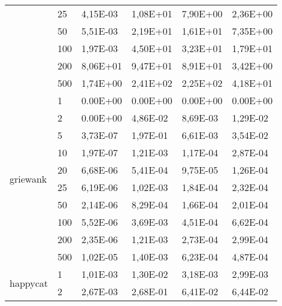 \begin{longtable}[c]{|p{3.5cm}|l|l|l|l|l|}
                                        & 25        & 4,15E-03   & 1,08E+01   & 7,90E+00   & 2,36E+00  \\ \cline{2-6} 
                                        & 50        & 5,51E-03   & 2,19E+01   & 1,61E+01   & 7,35E+00  \\ \cline{2-6} 
                                        & 100       & 1,97E-03   & 4,50E+01   & 3,23E+01   & 1,79E+01  \\ \cline{2-6} 
                                        & 200       & 8,06E+01   & 9,47E+01   & 8,91E+01   & 3,42E+00  \\ \cline{2-6} 
                                        & 500       & 1,74E+00   & 2,41E+02   & 2,25E+02   & 4,18E+01  \\ \hline
\multirow[t]{10}{*}{griewank}              & 1         & 0.00E+00   & 0.00E+00   & 0.00E+00   & 0.00E+00  \\ \cline{2-6} 
                                        & 2         & 0.00E+00   & 4,86E-02   & 8,69E-03   & 1,29E-02  \\ \cline{2-6} 
                                        & 5         & 3,73E-07   & 1,97E-01   & 6,61E-03   & 3,54E-02  \\ \cline{2-6} 
                                        & 10        & 1,97E-07   & 1,21E-03   & 1,17E-04   & 2,87E-04  \\ \cline{2-6} 
                                        & 20        & 6,68E-06   & 5,41E-04   & 9,75E-05   & 1,26E-04  \\ \cline{2-6} 
                                        & 25        & 6,19E-06   & 1,02E-03   & 1,84E-04   & 2,32E-04  \\ \cline{2-6} 
                                        & 50        & 2,14E-06   & 8,29E-04   & 1,66E-04   & 2,01E-04  \\ \cline{2-6} 
                                        & 100       & 5,52E-06   & 3,69E-03   & 4,51E-04   & 6,62E-04  \\ \cline{2-6} 
                                        & 200       & 2,35E-06   & 1,21E-03   & 2,73E-04   & 2,99E-04  \\ \cline{2-6} 
                                        & 500       & 1,02E-05   & 1,40E-03   & 6,23E-04   & 4,87E-04  \\ \hline
\multirow[t]{10}{*}{happycat}              & 1         & 1,01E-03   & 1,30E-02   & 3,18E-03   & 2,99E-03  \\ \cline{2-6} 
                                        & 2         & 2,67E-03   & 2,68E-01   & 6,41E-02   & 6,44E-02  \\ \cline{2-6} 

\end{longtable}
